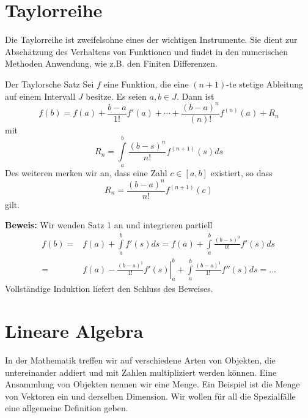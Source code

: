 \section{Taylorreihe}
Die Taylorreihe ist zweifelsohne eines der wichtigen Instrumente. Sie dient zur
Abschätzung des Verhaltens von Funktionen und findet in den numerischen
Methoden Anwendung, wie z.B. den Finiten Differenzen.
\begin{satz}{Der Taylorsche Satz\label{theo:Taylor}} Sei $f$ eine Funktion, die
  eine $(n+1)$-te stetige Ableitung auf einem Intervall $J$ besitze. Es seien
  $a,b\in J$. Dann ist 
\[
    f(b)=f(a)+\frac{b-a}{1!}f'(a)+\cdots +\frac{(b-a)^{n}}{(n)!}f^{(n)}(a)+R_n
\]
  mit
\[
    R_n=\int\limits_a^b\frac{(b-s)^{n}}{n!}f^{(n+1)}(s)ds
\]
Des weiteren merken wir an, dass eine Zahl $c\in[a,b]$ existiert, so dass
\[
    R_n=\frac{(b-a)^{n}}{n!}f^{(n+1)}(c)
\]
gilt.
\end{satz}
{\bf Beweis:} Wir wenden Satz 1 an und integrieren partiell
\begin{align}
  f(b)=&f(a)+\int\limits_a^bf'(s)ds=f(a)+\int\limits_a^b\frac{(b-s)^0}{0!}f'(s)ds\nonumber\\
  =&f(a)-\left.\frac{(b-s)^1}{1!}f'(s)\right|_a^b+\int\limits_a^b\frac{(b-s)^1}{1!}f''(s)ds=\dots
  \label{eq:TaylorProof1}
\end{align}
Vollständige Induktion liefert den Schluss des Beweises.
\section{Lineare Algebra}
In der Mathematik treffen wir auf verschiedene Arten von Objekten, die
untereinander addiert und mit Zahlen multipliziert werden können. Eine
Ansammlung von Objekten nennen wir eine Menge. Ein Beispiel ist die Menge von
Vektoren ein und derselben Dimension. Wir wollen für all die
Spezialfälle eine allgemeine Definition geben. 
